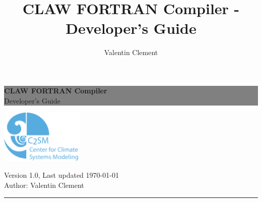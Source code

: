 \documentclass[a4paper, 11pt]{report}
\author{Valentin Clement}
\title{CLAW FORTRAN Compiler - Developer's Guide}
\newcommand{\HRule}{\rule{\linewidth}{0.5mm}}
\newcommand{\emptypage}{}
\begin{document}
\thispagestyle{empty} %

\colorbox{grey}{
	\parbox[t]{1.0\linewidth}{
		\centering \fontsize{35pt}{80pt}\selectfont

		\vspace*{2cm}

		\hfill \textbf{CLAW FORTRAN Compiler} \\
		\hfill Developer's Guide\par

		\vspace*{2cm}
	}
}

\vfill

\begin{center}
\includegraphics[width=4cm]{resources/c2sm_logo.pdf} \\
\end{center}

\vfill %

\begin{center}
Version 1.0, Last updated \today \\
Author: Valentin Clement
\end{center}
\HRule

\clearpage %




%

\end{document}
